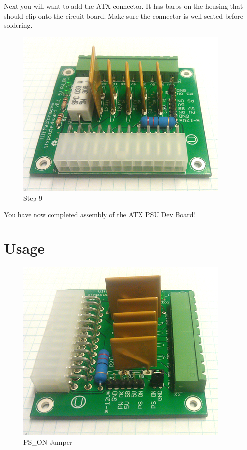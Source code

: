 Next you will want to add the ATX connector. It has barbs on the housing
that should clip onto the circuit board. Make sure the connector is well
seated before soldering.

\begin{figure}[H]
\centering
\includegraphics{./png/step-09.png}
\caption{Step 9}
\end{figure}

You have now completed assembly of the ATX PSU Dev Board!

\section{Usage}

\begin{figure}[H]
\centering
\includegraphics{./png/step-10.png}
\caption{PS\_ON Jumper}
\end{figure}

